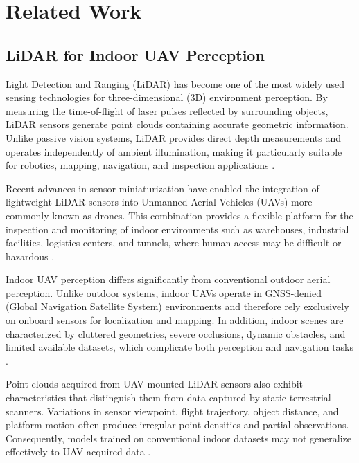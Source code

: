 \chapter{Related Work}
\label{cha:related-work}

\section{LiDAR for Indoor UAV Perception}

Light Detection and Ranging (LiDAR) has become one of the most widely used sensing technologies for three-dimensional (3D) environment perception. By measuring the time-of-flight of laser pulses reflected by surrounding objects, LiDAR sensors generate point clouds containing accurate geometric information. Unlike passive vision systems, LiDAR provides direct depth measurements and operates independently of ambient illumination, making it particularly suitable for robotics, mapping, navigation, and inspection applications \cite{Guo2020DeepLearningSurvey,Li2020DeepLearningLiDARReview}.

Recent advances in sensor miniaturization have enabled the integration of lightweight LiDAR sensors into Unmanned Aerial Vehicles (UAVs) more commonly known as drones. This combination provides a flexible platform for the inspection and monitoring of indoor environments such as warehouses, industrial facilities, logistics centers, and tunnels, where human access may be difficult or hazardous \cite{Bournez2024Indoor}.

Indoor UAV perception differs significantly from conventional outdoor aerial perception. Unlike outdoor systems, indoor UAVs operate in GNSS-denied (Global Navigation Satellite System) environments and therefore rely exclusively on onboard sensors for localization and mapping. In addition, indoor scenes are characterized by cluttered geometries, severe occlusions, dynamic obstacles, and limited available datasets, which complicate both perception and navigation tasks \cite{Suleymanoglu2022IndoorMappingLiDAR,Bournez2024Indoor}.

Point clouds acquired from UAV-mounted LiDAR sensors also exhibit characteristics that distinguish them from data captured by static terrestrial scanners. Variations in sensor viewpoint, flight trajectory, object distance, and platform motion often produce irregular point densities and partial observations. Consequently, models trained on conventional indoor datasets may not generalize effectively to UAV-acquired data \cite{Armeni2016S3DIS,Bournez2024Indoor}.

